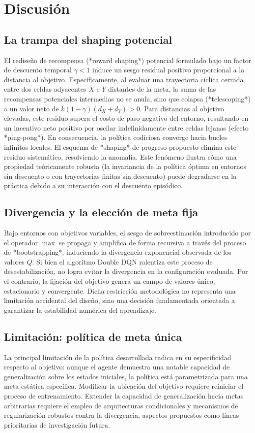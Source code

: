 \section{Discusión}
\label{sec:disc}

\subsection{La trampa del shaping potencial}
El rediseño de recompensa (*reward shaping*) potencial formulado bajo un factor de descuento temporal $\gamma < 1$ induce un sesgo residual positivo proporcional a la distancia al objetivo. Específicamente, al evaluar una trayectoria cíclica cerrada entre dos celdas adyacentes $X$ e $Y$ distantes de la meta, la suma de las recompensas potenciales intermedias no se anula, sino que colapsa (*telescoping*) a un valor neto de $k(1-\gamma)(d_X + d_Y) > 0$. Para distancias al objetivo elevadas, este residuo supera el costo de paso negativo del entorno, resultando en un incentivo neto positivo por oscilar indefinidamente entre celdas lejanas (efecto *ping-pong*). En consecuencia, la política codiciosa converge hacia bucles infinitos locales. El esquema de *shaping* de progreso propuesto elimina este residuo sistemático, resolviendo la anomalía. Este fenómeno ilustra cómo una propiedad teóricamente robusta (la invariancia de la política óptima en entornos sin descuento o con trayectorias finitas sin descuento) puede degradarse en la práctica debido a su interacción con el descuento episódico.

\subsection{Divergencia y la elección de meta fija}
Bajo entornos con objetivos variables, el sesgo de sobreestimación introducido por el operador $\max$ se propaga y amplifica de forma recursiva a través del proceso de *bootstrapping*, induciendo la divergencia exponencial observada de los valores $Q$. Si bien el algoritmo Double DQN ralentiza este proceso de desestabilización, no logra evitar la divergencia en la configuración evaluada. Por el contrario, la fijación del objetivo genera un campo de valores único, estacionario y convergente. Dicha restricción metodológica no representa una limitación accidental del diseño, sino una decisión fundamentada orientada a garantizar la estabilidad numérica del aprendizaje.

\subsection{Limitación: política de meta única}
La principal limitación de la política desarrollada radica en su especificidad respecto al objetivo: aunque el agente demuestra una notable capacidad de generalización sobre los estados iniciales, la política está parametrizada para una meta estática específica. Modificar la ubicación del objetivo requiere reiniciar el proceso de entrenamiento. Extender la capacidad de generalización hacia metas arbitrarias requiere el empleo de arquitecturas condicionales y mecanismos de regularización robustos contra la divergencia, aspectos propuestos como líneas prioritarias de investigación futura.
